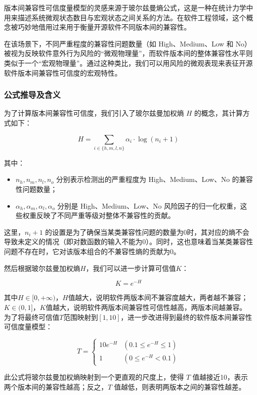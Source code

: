 \documentclass{article}
\begin{document}
版本间兼容性可信度量模型的灵感来源于玻尔兹曼熵公式，这是一种在统计力学中用来描述系统微观状态数目与宏观状态之间关系的方法。在软件工程领域，这个概念被巧妙地借用过来用于衡量开源软件不同版本间的兼容性。

在该场景下，不同严重程度的兼容性问题数量（如 High、Medium、Low 和 No）被视为反映软件意外行为风险的“微观物理量”，而软件版本间的整体兼容性水平则类似于一个“宏观物理量”。通过这种类比，我们可以用风险的微观表现来表征开源软件版本间兼容性可信度的宏观特性。

\subsubsection{公式推导及含义}

为了计算版本间兼容性可信度，我们引入了玻尔兹曼加权熵 $H$ 的概念，其计算方式如下：

$$ H = \sum_{i \in \{h,m,l,n\}} \alpha_i \cdot \log(n_i + 1) $$

其中：
\begin{itemize}
	\item $n_h, n_m, n_l, n_o$ 分别表示检测出的严重程度为 High、Medium、Low、No 的兼容性问题数量；
	\item $\alpha_h, \alpha_m, \alpha_l, \alpha_o$ 分别是 High、Medium、Low、No 风险因子的归一化权重，这些权重反映了不同严重等级对整体不兼容性的贡献。
\end{itemize}

这里，$n_i + 1$ 的设置是为了确保当某类兼容性问题的数量为0时，其对应的熵不会导致未定义的情况（即对数函数的输入不能为0）。同时，这也意味着当某类兼容性问题不存在时，它对该版本组合的不兼容性熵的贡献为0。

然后根据玻尔兹曼加权熵\(H\)，我们可以进一步计算可信值\(K\)：

$$ K = e^{-H} $$

其中\(H\in[0,+\infty)\)，\(H\)值越大，说明软件两版本间不兼容度越大，两者越不兼容；\(K\in(0,1]\)，\(K\)值越大，说明软件两版本间兼容性可信性越高，两版本间越兼容。为了将最终可信值\(T\)范围映射到\([1,10]\)，进一步改进得到最终的软件版本间兼容性可信度量模型：

\[T=\begin{cases}
	10e^{-H} & (0.1\leq e^{-H}\leq1)\\
	1 & (0\leq e^{-H}<0.1)
\end{cases}\]

此公式将玻尔兹曼加权熵映射到一个更直观的尺度上，使得 $T$ 值越接近10，表示两个版本间的兼容性越高；反之，$T$ 值越低，则表明两版本之间的兼容性越差。
\end{document}
